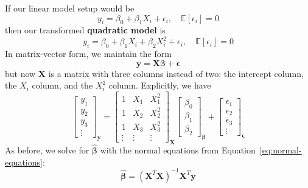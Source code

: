 \documentclass[twoside]{article}
\theoremstyle{definition}
\begin{document}
If our linear model setup would be
\begin{equation}
    y_i = \beta_0 + \beta_1 X_i + \epsilon_i, \quad \mathbb{E}[\epsilon_i] = 0
\end{equation}
then our transformed \textbf{quadratic model} is
\begin{equation}
    y_i = \beta_0 + \beta_1 X_i + \beta_2 X_i^2 + \epsilon_i, \quad \mathbb{E}[\epsilon_i] = 0
\end{equation}
In matrix-vector form, we maintain the form 
\begin{equation}
    \mathbf{y} = \mathbf{X} \boldsymbol{\beta} + \boldsymbol{\epsilon}
\end{equation}
but now $\mathbf{X}$ is a matrix with three columns instead of two: the intercept column, the $X_i$ column, and the $X_i^2$ column. Explicitly, we have
\begin{equation}
    \begin{bmatrix}
        y_1 \\
        y_2 \\
        y_3 \\
        \vdots
    \end{bmatrix}_{\mathbf{y}}
    =
    \begin{bmatrix}
        1 & X_1 & X_1^2 \\
        1 & X_2 & X_2^2 \\
        1 & X_3 & X_3^2 \\
        \vdots & \vdots & \vdots
    \end{bmatrix}_{\mathbf{X}}
    \begin{bmatrix}
        \beta_0 \\
        \beta_1 \\
        \beta_2
    \end{bmatrix}_{\boldsymbol{\beta}}
    +
    \begin{bmatrix}
        \epsilon_1 \\
        \epsilon_2 \\
        \epsilon_3 \\
        \vdots
    \end{bmatrix}_{\boldsymbol{\epsilon}}
    \label{eq:quadratic-matrix}
\end{equation}
As before, we solve for $\widehat{\boldsymbol{\beta}}$ with the normal equations from Equation~\ref{eq:normal-equations}:
\begin{equation}
    \widehat{\boldsymbol{\beta}} = (\mathbf{X}^T \mathbf{X})^{-1} \mathbf{X}^T \mathbf{y}
\end{equation}
\end{document}
